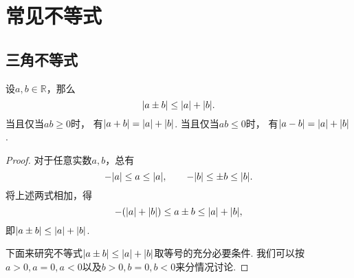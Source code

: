 \section{常见不等式}
\subsection{三角不等式}
\begin{theorem}[三角不等式I]\label{theorem:不等式.三角不等式1}
设\(a,b\in\mathbb{R}\)，那么\begin{equation}
	\abs{a \pm b}
	\leq
	\abs{a} + \abs{b}.
\end{equation}
当且仅当\(ab\geq0\)时，
有\(\abs{a+b}=\abs{a}+\abs{b}\).
当且仅当\(ab\leq0\)时，
有\(\abs{a-b}=\abs{a}+\abs{b}\).
\begin{proof}
对于任意实数\(a,b\)，总有\begin{equation*}
	-\abs{a} \leq a \leq \abs{a}, \qquad
	-\abs{b} \leq \pm b \leq \abs{b}.
\end{equation*}
将上述两式相加，得\begin{equation*}
	-(\abs{a}+\abs{b}) \leq a \pm b \leq \abs{a}+\abs{b},
\end{equation*}
即\(\abs{a \pm b} \leq \abs{a}+\abs{b}\).

下面来研究不等式\(\abs{a \pm b} \leq \abs{a} + \abs{b}\)取等号的充分必要条件.
我们可以按\(a>0,a=0,a<0\)以及\(b>0,b=0,b<0\)来分情况讨论.


\end{proof}
\end{theorem}
